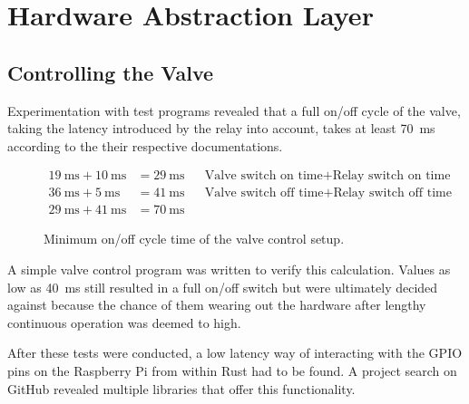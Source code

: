 \section{Hardware Abstraction Layer}
\author{Philip Trauner}

\subsection{Controlling the Valve}
Experimentation with test programs revealed that a full on/off cycle of the valve, taking the latency introduced by the relay into account, takes at least \SI{70}{\milli\second} according to the their respective documentations. 
\begin{figure}[H]
\begin{align*}
    \SI{19}{\milli\second} + \SI{10}{\milli\second} &=\SI{29}{\milli\second} && \text{Valve switch on time} + \text{Relay switch on time} \\
    \SI{36}{\milli\second} + \SI{5}{\milli\second}  &=\SI{41}{\milli\second} && \text{Valve switch off time} + \text{Relay switch off time}\\
    \SI{29}{\milli\second} + \SI{41}{\milli\second} &=\SI{70}{\milli\second} 
\end{align*}
\caption{Minimum on/off cycle time of the valve control setup.}
\end{figure}

A simple valve control program was written to verify this calculation. Values as low as \SI{40}{\milli\second} still resulted in a full on/off switch but were ultimately decided against because the chance of them wearing out the hardware after lengthy continuous operation was deemed to high.

After these tests were conducted, a low latency way of interacting with the GPIO pins on the Raspberry Pi from within Rust had to be found. A project search on GitHub revealed multiple libraries that offer this functionality. 

